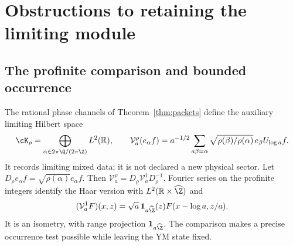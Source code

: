 \section{Obstructions to retaining the limiting module}\label{sec:obstructions}
\subsection{The profinite comparison and bounded occurrence}
The rational phase channels of Theorem~\ref{thm:packets} define
the auxiliary limiting Hilbert space
\begin{equation}
\cK_\rho=\bigoplus_{\alpha\in2\pi\Q/(2\pi\Z)}L^2(\R),
\qquad
\mathcal V_a^\rho(e_\alpha f)=a^{-1/2}
\sum_{a\beta=\alpha}\sqrt{\rho(\beta)/\rho(\alpha)}
\,e_\beta U_{\log a}f .
\end{equation}
It records limiting mixed data; it is not declared a new physical
sector. Let $D_\rho e_\alpha f=\sqrt{\rho(\alpha)}e_\alpha f$.
Then $\mathcal V_a^\rho=D_\rho\mathcal V_a^1D_\rho^{-1}$.
Fourier series on the profinite integers identify the Haar version
with $L^2(\R\times\widehat\Z)$ and
\begin{equation}\label{eq:profinite-action}
(\mathcal V_a^1F)(x,z)=
\sqrt a\,\mathbf1_{a\widehat\Z}(z)F(x-\log a,z/a).
\end{equation}
It is an isometry, with range projection
$\mathbf1_{a\widehat\Z}$. The comparison makes a precise occurrence
test possible while leaving the YM state fixed.


